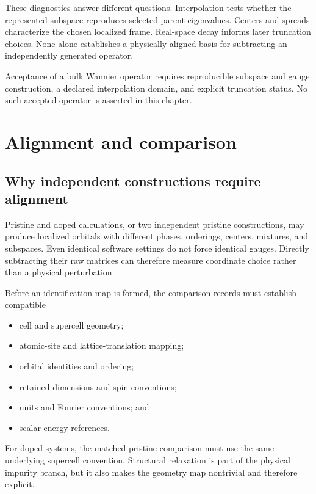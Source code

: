 These diagnostics answer different questions. Interpolation tests whether the
represented subspace reproduces selected parent eigenvalues. Centers and spreads
characterize the chosen localized frame. Real-space decay informs later
truncation choices. None alone establishes a physically aligned basis for
subtracting an independently generated operator.

Acceptance of a bulk Wannier operator requires reproducible subspace and gauge
construction, a declared interpolation domain, and explicit truncation status.
No such accepted operator is asserted in this chapter.

\section{Alignment and comparison}

\subsection{Why independent constructions require alignment}


Pristine and doped calculations, or two independent pristine constructions, may
produce localized orbitals with different phases, orderings, centers, mixtures,
and subspaces. Even identical software settings do not force identical gauges.
Directly subtracting their raw matrices can therefore measure coordinate choice
rather than a physical perturbation.

Before an identification map is formed, the comparison records must establish
compatible

\begin{itemize}
  \item cell and supercell geometry;
  \item atomic-site and lattice-translation mapping;
  \item orbital identities and ordering;
  \item retained dimensions and spin conventions;
  \item units and Fourier conventions; and
  \item scalar energy references.
\end{itemize}

For doped systems, the matched pristine comparison must use the same underlying
supercell convention. Structural relaxation is part of the physical impurity
branch, but it also makes the geometry map nontrivial and therefore explicit.

